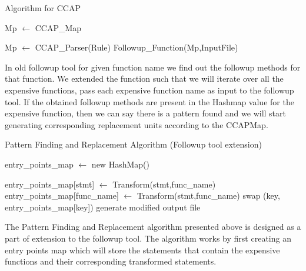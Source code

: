 \begin{algorithm} 
\caption{Algorithm for CCAP}\label{alg:cap}
\begin{algorithmic}
\State Mp $\gets$ CCAP\_Map  %

\State Mp $\gets$ CCAP\_Parser(Rule) %
\State Followup\_Function(Mp,InputFile)

\end{algorithmic}
\end{algorithm}

In old followup tool for given function name we find out the followup methods for that function. We extended the function such that we will iterate over all the expensive functions, pass each expensive function name as input to the followup tool. If the obtained followup methods are present in the Hashmap value for the expensive function, then we can say there is a pattern found and we will start generating corresponding replacement units according to the CCAPMap.


\begin{algorithm} 
\caption{Pattern Finding and Replacement Algorithm (Followup tool extension)}\label{alg:Epg}
\begin{algorithmic}
\State entry\_points\_map $\gets$ new HashMap()

                \State entry\_points\_map[stmt] $\gets$ Transform(stmt,func\_name)
                \State entry\_points\_map[func\_name] $\gets$ Transform(stmt,func\_name)
            \EndIf
         \EndFor
        \EndFor
    \EndFor
\EndFor
{}
                \State swap (key, entry\_points\_map[key])
            \EndIf
         \EndFor
        \EndFor
        \State generate modified output file
    \EndFor

\end{algorithmic}
\end{algorithm}

The Pattern Finding and Replacement algorithm presented above is designed as a part of extension to the followup tool. The algorithm works by first creating an entry points map which will store the statements that contain the expensive functions and their corresponding transformed statements. 

